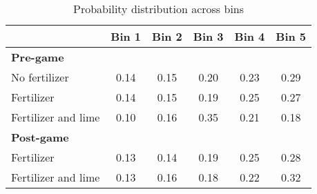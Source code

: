 \begin{table}[htbp]
\centering
\hspace*{-1.2cm}
\begin{threeparttable}
\caption{Probability distribution across bins }
\label{tab:distbins}
\begin{tabular}{l ccccc}
\hline
\hline
                    &       Bin 1&       Bin 2&       Bin 3&       Bin 4&       Bin 5\\
\hline
\textbf{Pre-game}   &            &            &            &            &            \\
No fertilizer       &        0.14&        0.15&        0.20&        0.23&        0.29\\
%
%
%
Fertilizer  &        0.14&        0.15&        0.19&        0.25&        0.27\\
%
%
%
Fertilizer and lime&        0.10&        0.16&        0.35&        0.21&        0.18\\
\hline
%
%
\textbf{Post-game}&            &            &            &            &            \\
Fertilizer  &        0.13&        0.14&        0.19&        0.25&        0.28\\
%
%
Fertilizer and lime&        0.13&        0.16&        0.18&        0.22&        0.32\\
\hline
\hline
\end{tabular}
\end{threeparttable}
\end{table}
